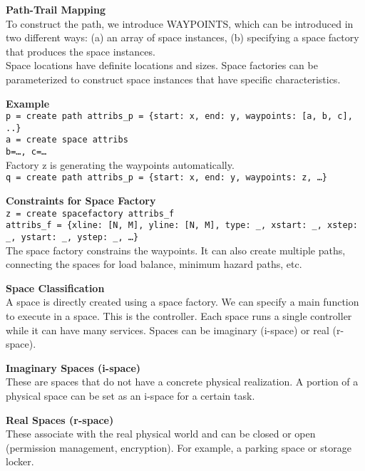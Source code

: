 \documentclass[10pt,a4paper]{article}
\begin{document}
\begin{multicols}{2}
    \textbf{Path-Trail Mapping}\\
    To construct the path, we introduce WAYPOINTS, which can be introduced in two different ways: (a) an array of space instances, (b) specifying a space factory that produces the space instances.\\
    Space locations have definite locations and sizes. Space factories can be parameterized to construct space instances that have specific characteristics.

    \textbf{Example}\\
    \texttt{p = create path attribs\_p = \{start: x, end: y, waypoints: [a, b, c], ..\}}\\
    \texttt{a = create space attribs}\\
    \texttt{b=…, c=…}\\
    Factory z is generating the waypoints automatically.\\
    \texttt{q = create path attribs\_p = \{start: x, end: y, waypoints: z, …\}}

    \textbf{Constraints for Space Factory}\\
    \texttt{z = create spacefactory attribs\_f}\\
    \texttt{attribs\_f = \{xline: [N, M], yline: [N, M], type: \_, xstart: \_, xstep: \_, ystart: \_, ystep: \_, …\}}\\
    The space factory constrains the waypoints. It can also create multiple paths, connecting the spaces for load balance, minimum hazard paths, etc.

    \textbf{Space Classification}\\
    A space is directly created using a space factory. We can specify a main function to execute in a space. This is the controller. Each space runs a single controller while it can have many services. Spaces can be imaginary (i-space) or real (r-space).

    \textbf{Imaginary Spaces (i-space)}\\
    These are spaces that do not have a concrete physical realization. A portion of a physical space can be set as an i-space for a certain task.

    \textbf{Real Spaces (r-space)}\\
    These associate with the real physical world and can be closed or open (permission management, encryption). For example, a parking space or storage locker.

\end{multicols} %
\end{document}
